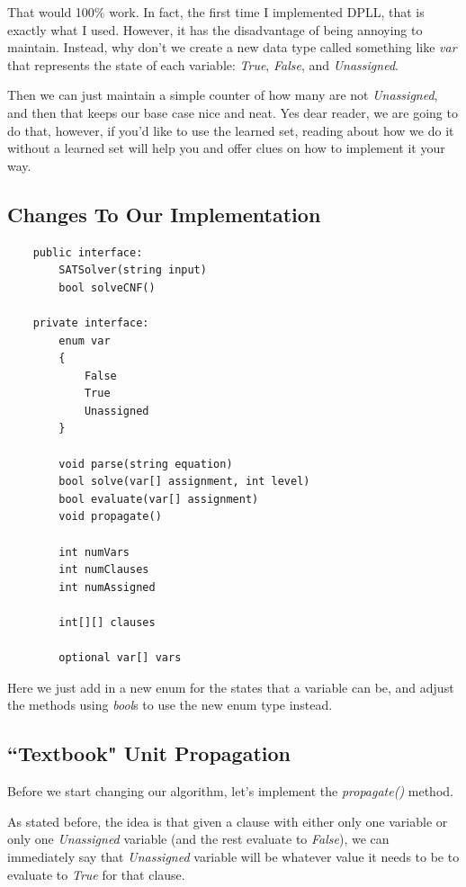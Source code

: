 \documentclass[../main.tex]{subfiles}
\begin{document}
That would 100\% work. In fact, the first time I implemented DPLL,
that is exactly what I used. However, it has the disadvantage of being annoying 
to maintain. Instead, why don't we create a new data type called something like
\textit{var} that represents the state of each variable: \textit{True},
\textit{False}, and \textit{Unassigned}.

Then we can just maintain a simple counter of how many are not
\textit{Unassigned}, and then that keeps our base case nice and neat.
Yes dear reader, we are going to do that, however, if you'd like to use the
learned set, reading about how we do it without a learned set will help you
and offer clues on how to implement it your way.

\subsection{Changes To Our Implementation}

\begin{lstlisting}
    public interface:
        SATSolver(string input)
        bool solveCNF()

    private interface:
        enum var
        {
            False
            True
            Unassigned
        }

        void parse(string equation)
        bool solve(var[] assignment, int level)
        bool evaluate(var[] assignment)
        void propagate()

        int numVars
        int numClauses
        int numAssigned

        int[][] clauses

        optional var[] vars
\end{lstlisting}

Here we just add in a new enum for the states that a variable can be, and
adjust the methods using \textit{bool}s to use the new enum type instead.

\subsection{``Textbook" Unit Propagation}

Before we start changing our algorithm, let's implement the
\textit{propagate()} method.

As stated before, the idea is that given a clause with either only one variable
or only one \textit{Unassigned} variable (and the rest evaluate to
\textit{False}), we can immediately say that \textit{Unassigned} variable will
be whatever value it needs to be to evaluate to \textit{True} for that clause.
\end{document}
